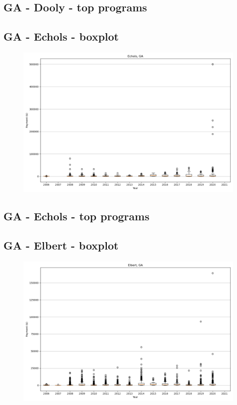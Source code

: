 \subsection*{GA - Dooly - top programs}

\newpage
\subsection*{GA - Echols - boxplot}
\begin{figure}[h]
\centering
\includegraphics[width=7in]{../output/boxplots/counties/Echols-GA_boxplot.png}
\end{figure}


\subsection*{GA - Echols - top programs}

\newpage
\subsection*{GA - Elbert - boxplot}
\begin{figure}[h]
\centering
\includegraphics[width=7in]{../output/boxplots/counties/Elbert-GA_boxplot.png}
\end{figure}


